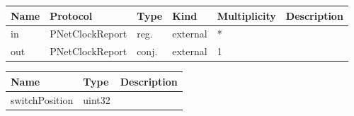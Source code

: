 

\begin{tabular}[ht]{|l|l|l|l|l|p{5cm}|}
\hline
\textbf{Name} & \textbf{Protocol} & \textbf{Type} & \textbf{Kind} & \textbf{Multiplicity} & \textbf{Description}\\
\hline
in & PNetClockReport & reg. & external & * & \\
\hline
out & PNetClockReport & conj. & external & 1 & \\
\hline
\end{tabular}


\begin{par}

\end{par}


\begin{tabular}[ht]{|l|l|p{8cm}|}
\hline
\textbf{Name} & \textbf{Type} & \textbf{Description}\\
\hline
switchPosition & uint32 & \\
\hline
\end{tabular}

